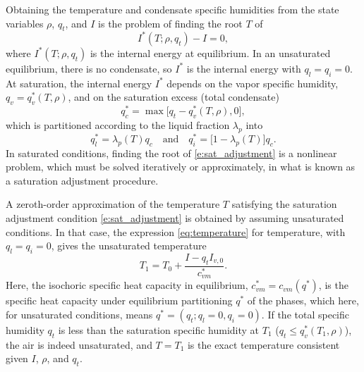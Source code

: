 \documentclass{report}
\begin{document}
Obtaining the temperature and condensate specific humidities from the state variables $\rho$, $q_t$, and $I$ is the problem of finding the root $T$ of
\begin{equation}\label{e:sat_adjustment}
I^*(T; \rho, q_t) - I = 0,
\end{equation}
where $I^*(T; \rho, q_t)$ is the internal energy at equilibrium. In an unsaturated equilibrium, there is no condensate, so $I^*$ is the internal energy with $q_l=q_i=0$. At saturation, the internal energy $I^*$ depends on the vapor specific humidity, $q_v = q_v^*(T, \rho)$, and on the saturation excess (total condensate) 
\begin{equation}
q_c^* = \max\bigl[q_t - q_v^*(T, \rho), 0\bigr], 
\end{equation}
which is partitioned according to the liquid fraction $\lambda_p$ into 
\begin{equation}\label{e:phase_partition}
q_l^* = \lambda_p(T) q_c \quad \text{and} \quad q_i^* = \bigl[1-\lambda_p(T)\bigr]q_c.
\end{equation} 
In saturated conditions, finding the root of \eqref{e:sat_adjustment} is a nonlinear problem, which must be solved iteratively or approximately, in what is known as a saturation adjustment procedure. 

A zeroth-order approximation of the temperature $T$ satisfying the saturation adjustment condition \eqref{e:sat_adjustment} is obtained by assuming unsaturated conditions. In that case, the expression \eqref{eq:temperature} for temperature, with $q_l=q_i=0$, gives the unsaturated temperature 
\begin{equation}
    T_1 = T_0 + \frac{I - q_t I_{v,0}}{c_{vm}^*}.
\end{equation}
Here, the isochoric specific heat capacity in equilibrium, $c_{vm}^* = c_{vm}(q^*)$, is the specific heat capacity under equilibrium partitioning $q^*$ of the phases, which here, for unsaturated conditions, means $q^*=(q_t; q_l=0, q_i=0)$. If the total specific humidity $q_t$ is less than the saturation specific humidity at $T_1$ ($q_t \le q_v^*(T_1, \rho)$), the air is indeed unsaturated, and $T=T_1$ is the exact temperature consistent given $I$, $\rho$, and $q_t$. 
\end{document}
